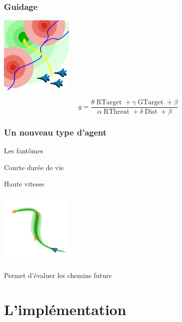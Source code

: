 \documentclass{beamer}
\begin{document}
\begin{block}

  \frametitle{Guidage}

  \includegraphics[width=3.5cm]{terrain_field.png}

  \begin{equation}
    g = \frac{ \theta \operatorname{RTarget} + \gamma \operatorname{GTarget} + \beta}{\alpha \operatorname{RThreat} + \delta \operatorname{Dist} + \beta}
  \end{equation}

\end{block}

\begin{block}

  \frametitle{Un nouveau type d'agent}

  \begin{block}{Les fantômes}
    \item{Courte durée de vie}
    \item{Haute vitesse}
  \end{block}

  \includegraphics[width=3.5cm]{ghosts.png}

  Permet d'évaluer les chemins futurs

\end{block}

\section{L'implémentation}
\end{document}
